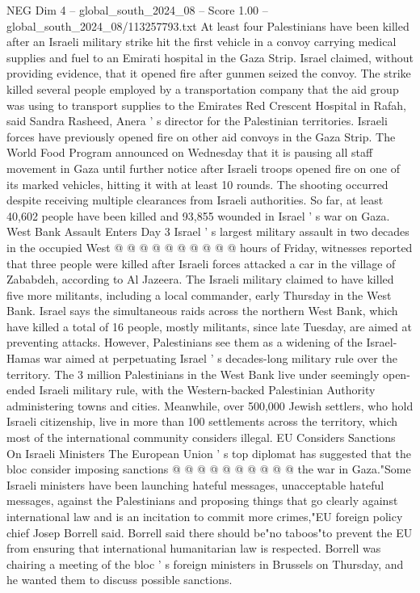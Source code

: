 \begin{textsample}{NEG Dim 4 – global\_south\_2024\_08 – Score 1.00 – global\_south\_2024\_08/113257793.txt}  \label{ex:f4_neg_340}
At least four Palestinians have been killed after an Israeli military strike hit the first vehicle in a convoy carrying medical supplies and fuel to an Emirati hospital in the Gaza Strip.
Israel claimed, without providing evidence, that it opened fire after gunmen seized the convoy.
The strike killed several people employed by a transportation company that the aid group was using to transport supplies to the Emirates Red Crescent Hospital in Rafah, said Sandra Rasheed, Anera ' s director for the Palestinian territories.
Israeli forces have previously opened fire on other aid convoys in the Gaza Strip.
The World Food Program announced on Wednesday that it is pausing all staff movement in Gaza until further notice after Israeli troops opened fire on one of its marked vehicles, hitting it with at least 10 rounds.
The shooting occurred despite receiving multiple clearances from Israeli authorities.
So far, at least 40,602 people have been killed and 93,855 wounded in Israel ' s war on Gaza.
West Bank Assault Enters Day 3 Israel ' s largest military assault in two decades in the occupied West @ @ @ @ @ @ @ @ @ @ hours of Friday, witnesses reported that three people were killed after Israeli forces attacked a car in the village of Zababdeh, according to Al Jazeera.
The Israeli military claimed to have killed five more militants, including a local commander, early Thursday in the West Bank.
Israel says the simultaneous raids across the northern West Bank, which have killed a total of 16 people, mostly militants, since late Tuesday, are aimed at preventing attacks.
However, Palestinians see them as a widening of the Israel-Hamas war aimed at perpetuating Israel ' s decades-long military rule over the territory.
The 3 million Palestinians in the West Bank live under seemingly open-ended Israeli military rule, with the Western-backed Palestinian Authority administering towns and cities.
Meanwhile, over 500,000 Jewish settlers, who hold Israeli citizenship, live in more than 100 settlements across the territory, which most of the international community considers illegal.
EU Considers Sanctions On Israeli Ministers The European Union ' s top diplomat has suggested that the bloc consider imposing sanctions @ @ @ @ @ @ @ @ @ @ the war in Gaza."Some Israeli ministers have been launching hateful messages, unacceptable hateful messages, against the Palestinians and proposing things that go clearly against international law and is an incitation to commit more crimes,"EU foreign policy chief Josep Borrell said.
Borrell said there should be"no taboos"to prevent the EU from ensuring that international humanitarian law is respected.
Borrell was chairing a meeting of the bloc ' s foreign ministers in Brussels on Thursday, and he wanted them to discuss possible sanctions.

\end{textsample}
